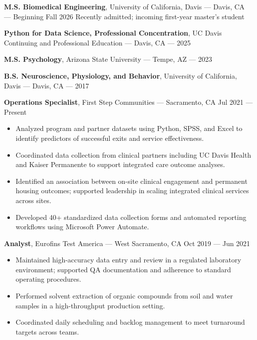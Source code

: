 \documentclass[11pt]{article}
\providecommand{\tightlist}{\setlength{\itemsep}{0pt}\setlength{\parskip}{0pt}}
\renewcommand{\subsection}[1]{\par\medskip\noindent{\sffamily\bfseries\fontsize{11pt}{0}\selectfont #1}\par\smallskip}
\begin{document}
\subsection{Education}\label{education}

\textbf{M.S. Biomedical Engineering}, University of California, Davis
--- Davis, CA --- Beginning Fall 2026 Recently admitted; incoming
first-year master's student

\textbf{Python for Data Science, Professional Concentration}, UC Davis
Continuing and Professional Education --- Davis, CA --- 2025

\textbf{M.S. Psychology}, Arizona State University --- Tempe, AZ ---
2023

\textbf{B.S. Neuroscience, Physiology, and Behavior}, University of
California, Davis --- Davis, CA --- 2017

\subsection{Professional Experience}\label{professional-experience}

\textbf{Operations Specialist}, First Step Communities --- Sacramento,
CA Jul 2021 --- Present

\begin{itemize}
\tightlist
\item
  Analyzed program and partner datasets using Python, SPSS, and Excel to
  identify predictors of successful exits and service effectiveness.
\item
  Coordinated data collection from clinical partners including UC Davis
  Health and Kaiser Permanente to support integrated care outcome
  analyses.
\item
  Identified an association between on-site clinical engagement and
  permanent housing outcomes; supported leadership in scaling integrated
  clinical services across sites.
\item
  Developed 40+ standardized data collection forms and automated
  reporting workflows using Microsoft Power Automate.
\end{itemize}

\textbf{Analyst}, Eurofins Test America --- West Sacramento, CA Oct 2019
--- Jun 2021

\begin{itemize}
\tightlist
\item
  Maintained high-accuracy data entry and review in a regulated
  laboratory environment; supported QA documentation and adherence to
  standard operating procedures.
\item
  Performed solvent extraction of organic compounds from soil and water
  samples in a high-throughput production setting.
\item
  Coordinated daily scheduling and backlog management to meet turnaround
  targets across teams.
\end{itemize}
\end{document}

